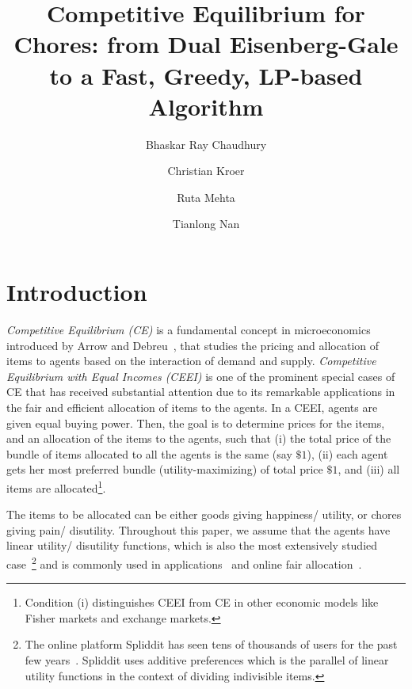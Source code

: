 \documentclass[format=acmsmall,authorversion]{acmart}
\title{%
Competitive Equilibrium for Chores: from Dual Eisenberg-Gale to a Fast, Greedy, LP-based Algorithm
}
\author{Bhaskar Ray Chaudhury}
\affiliation{University of Illinois at Urbana-Champaign, USA}
\author{Christian Kroer}
\affiliation{Columbia University, USA}
\author{Ruta Mehta}
\affiliation{University of Illinois at Urbana-Champaign, USA}
\author{Tianlong Nan}
\affiliation{Columbia University, USA}
\begin{document}
\begin{titlepage}

\maketitle
\thispagestyle{empty}

\setcounter{tocdepth}{2} %
\tableofcontents

\end{titlepage}

\section{Introduction} 

\emph{Competitive Equilibrium (CE)} is a fundamental concept in microeconomics introduced by Arrow and Debreu~\cite{ArrowD54}, that studies the pricing and allocation of items to agents based on the interaction of demand and supply. \emph{Competitive Equilibrium with Equal Incomes (CEEI)} is one of the prominent special cases of CE that has received substantial attention due to its remarkable applications in the fair and efficient allocation of items to the agents. In a CEEI, agents are given equal buying power. Then, the goal is to determine prices for the items, and an allocation of the items to the agents, such that (i) the total price of the bundle of items allocated to all the agents is the same (say $\$1$), (ii) each agent gets her most preferred bundle (utility-maximizing) of total price $\$1$, and (iii) all items are allocated\footnote{Condition (i) distinguishes CEEI from CE in other economic models like Fisher markets and exchange markets.}.

The items to be allocated can be either goods giving happiness/ utility, or chores giving pain/ disutility. Throughout this paper, we assume that the agents have linear utility/ disutility functions, which is also the most extensively studied case~\cite{goldman2015spliddit}\footnote{The online platform Spliddit has seen tens of thousands of users for the past few years~\cite{goldman2015spliddit}. Spliddit uses additive preferences which is the parallel of linear utility functions in the context of dividing indivisible items.} and is commonly used in applications~\citep{spliddit,conitzer2022pacing,allouah2023fair} and online fair allocation~\citep{azar2016allocate,banerjee2022online,gao2021online,benade2023fair}.
\end{document}

